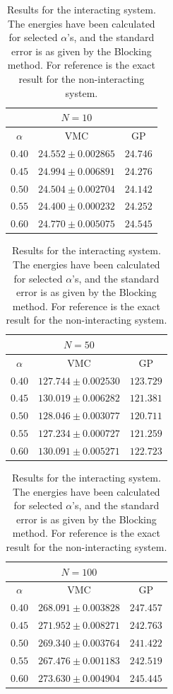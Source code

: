 \documentclass[twocolumn]{article}
\begin{document}
\clearpage
\begin{table}
    \center
    \caption{Results for the interacting system. The energies have been
    calculated for selected $\alpha$'s, and the standard error is as given by
    the Blocking method. For reference is the exact result for the
    non-interacting system.}
    \label{tab:inter-manual}
\begin{tabular}{|c|c|c|}\hline
$\,$ & $N=10$ & $\,$ \\ \hline
$\alpha$ & VMC & GP\\ \hline
$0.40$ & $24.552 \pm 0.002865$ & $24.746$\\ \hline
$0.45$ & $24.994 \pm 0.006891$ & $24.276$\\ \hline
$0.50$ & $24.504 \pm 0.002704$ & $24.142$\\ \hline
$0.55$ & $24.400 \pm 0.000232$ & $24.252$\\ \hline
$0.60$ & $24.770 \pm 0.005075$ & $24.545$\\ \hline
\end{tabular}
\vspace{0.5cm}
\begin{tabular}{|c|c|c|}\hline
$\,$ & $N=50$ & $\,$ \\ \hline
$\alpha$ & VMC & GP\\ \hline
$0.40$ & $127.744 \pm 0.002530$ & $123.729$\\ \hline
$0.45$ & $130.019 \pm 0.006282$ & $121.381$\\ \hline
$0.50$ & $128.046 \pm 0.003077$ & $120.711$\\ \hline
$0.55$ & $127.234 \pm 0.000727$ & $121.259$\\ \hline
$0.60$ & $130.091 \pm 0.005271$ & $122.723$\\ \hline
\end{tabular}
\vspace{0.5cm}
\begin{tabular}{|c|c|c|}\hline
$\,$ & $N=100$ & $\,$ \\ \hline
$\alpha$ & VMC & GP\\ \hline
$0.40$ & $268.091 \pm 0.003828$ & $247.457$\\ \hline
$0.45$ & $271.952 \pm 0.008271$ & $242.763$\\ \hline
$0.50$ & $269.340 \pm 0.003764$ & $241.422$\\ \hline
$0.55$ & $267.476 \pm 0.001183$ & $242.519$\\ \hline
$0.60$ & $273.630 \pm 0.004904$ & $245.445$\\ \hline
\end{tabular}
\end{table}
\end{document}
